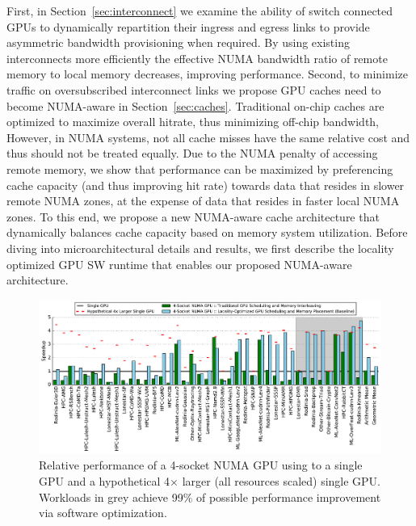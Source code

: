 First, in Section~\ref{sec:interconnect} we examine the 
ability of switch connected GPUs to dynamically repartition their ingress and 
egress links to provide asymmetric bandwidth provisioning when required.  By 
using existing interconnects more efficiently the effective NUMA bandwidth ratio 
of remote memory to local memory decreases, improving performance. Second, 
to minimize traffic on oversubscribed interconnect links we propose GPU caches need 
to become NUMA-aware in Section~\ref{sec:caches}. Traditional on-chip caches are 
optimized to maximize 
overall hitrate, thus minimizing off-chip bandwidth, However, in NUMA 
systems, not all cache misses have the same relative cost and thus should not 
be treated equally. Due to the NUMA penalty of accessing remote memory, we show 
that performance can be maximized by preferencing cache capacity (and thus 
improving hit rate) towards data that resides in slower remote NUMA zones, at the 
expense of data that resides in faster local NUMA zones. To this end, we propose 
a new NUMA-aware cache architecture that dynamically balances cache capacity based on 
memory system utilization. Before diving into microarchitectural details and results,
we first describe the locality optimized GPU SW runtime that enables our proposed
NUMA-aware architecture.

\begin{figure}[tp] 
    \centering
    \includegraphics[width=1.0\linewidth]{figures/plot_different_baselines.pdf}
    \vspace{-.1in}
    \caption{Relative performance of a 4-socket NUMA GPU using to a single GPU 
and a hypothetical 4$\times$ larger (all resources scaled) single GPU.
Workloads in grey achieve 99\% of possible performance improvement via software optimization.}
    \label{fig:motivation}
    \vspace{-.2in}
\end{figure}
